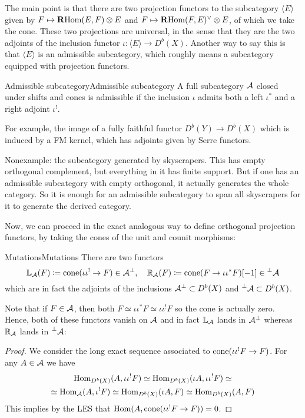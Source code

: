 
The main point is that there are two projection functors to the subcategory $\langle E \rangle$ given by $F\mapsto\operatorname{\mathbf{R} Hom}(E,F)\otimes E$ and $F\mapsto\operatorname{\mathbf{R} Hom}(F,E)^\lor\otimes E$, of which we take the cone. These two projections are universal, in the sense that they are the two adjoints of the inclusion functor $\iota:\langle E \rangle \to D^b(X)$. Another way to say this is that $\langle E \rangle$ is an admissible subcategory, which roughly means a subcategory equipped with projection functors.

\begin{definition}{Admissible subcategory}{Admissible subcategory}
    A full subcategory $\mathcal{A}$ closed under shifts and cones is admissible if the inclusion $\iota$ admits both a left $\iota^*$ and a right adjoint $\iota^!$.
\end{definition}

For example, the image of a fully faithful functor $D^b(Y)\to D^b(X)$ which is induced by a FM kernel, which has adjoints given by Serre functors. 

Nonexample: the subcategory generated by skyscrapers. This has empty orthogonal complement, but everything in it has finite support. But if one has an admissible subcategory with empty orthogonal, it actually generates the whole category. So it is enough for an admissible subcategory to span all skyscrapers for it to generate the derived category.

Now, we can proceed in the exact analogous way to define orthogonal projection functors, by taking the cones of the unit and counit morphisms:


\begin{definition}{Mutations}{Mutations}
    There are two functors
    \begin{equation*}
        \mathbb{L}_{\mathcal{A}}(F) \coloneqq \operatorname{cone}(\iota\iota^!\to F)\in \mathcal{A}^\perp, \quad
        \mathbb{R}_{\mathcal{A}}(F) \coloneqq \operatorname{cone}(F\to \iota\iota^* F )[-1]\in \prescript{\perp}{}{\mathcal{A}}
    \end{equation*}
    which are in fact the adjoints of the inclusions $\mathcal{A}^\perp \subset D^b(X)$ and $\prescript{\perp}{}{\mathcal{A}}\subset D^b(X)$.
\end{definition}

Note that if $F\in \mathcal{A}$, then both $F\simeq \iota\iota^* F \simeq \iota\iota^! F$ so the cone is actually zero. Hence, both of these functors vanish on $\mathcal{A}$ and in fact $\mathbb{L}_{\mathcal{A}}$ lands in $\mathcal{A}^\perp$ whereas $\mathbb{R}_{\mathcal{A}}$ lands in $\prescript{\perp}{}{\mathcal{A}}$:
\begin{proof}
    We consider the long exact sequence associated to $\operatorname{cone}(\iota\iota^!F\to F)$. For any $A\in \mathcal{A}$ we have
    \begin{gather*}
        \operatorname{Hom}_{D^b(X)}(A, \iota\iota^!F)
            \simeq \operatorname{Hom}_{D^b(X)}(\iota A, \iota\iota^!F)\simeq \\
            \simeq \operatorname{Hom}_{\mathcal{A}}(A, \iota^!F)\simeq \operatorname{Hom}_{D^b(X)}(\iota A, F)
            \simeq \operatorname{Hom}_{D^b(X)}(A, F)
    \end{gather*}
    This implies by the LES that $\operatorname{Hom}(A,\operatorname{cone}(\iota\iota^!F\to F))=0$.
\end{proof}

